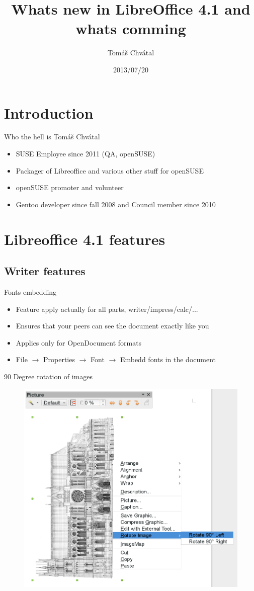 \documentclass{beamer}
\author{Tom\'{a}\v{s} Chv\'{a}tal\newline {\small openSUSE Team}}
\title{Whats new in LibreOffice 4.1 and whats comming}
\date{2013/07/20}
\begin{document}
\begin{frame}[t,plain]
\titlepage
\end{frame}

\section{Introduction}

\begin{frame}[t]{Who the hell is Tomáš Chvátal}
	\begin{itemize}
	\item SUSE Employee since 2011 (QA, openSUSE)
	\item Packager of Libreoffice and various other stuff for openSUSE
	\item openSUSE promoter and volunteer
	\item Gentoo developer since fall 2008 and Council member since 2010
	\end{itemize}
\end{frame}

\section{Libreoffice 4.1 features}

\subsection{Writer features}

\begin{frame}[t]{Fonts embedding}
	\begin{itemize}
	\item Feature apply actually for all parts, writer/impress/calc/...
	\item Ensures that your peers can see the document exactly like you
	\item Applies only for OpenDocument formats
	\item File $\rightarrow$ Properties $\rightarrow$ Font $\rightarrow$ Embedd fonts in the document
	\end{itemize}
\end{frame}

\begin{frame}{90 Degree rotation of images}
	\begin{figure}
	\includegraphics[width= 0.6\linewidth]{90degreerotation-writer.png}
	\end{figure}
\end{frame}
\end{document}
